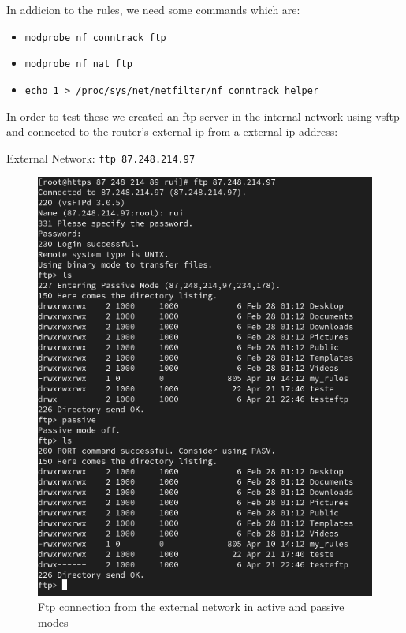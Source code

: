\documentclass{article}
\begin{document}
In addicion to the rules, we need some commands which are:
\begin{itemize}
    \item \texttt{modprobe nf\_conntrack\_ftp}\par
    \item \texttt{modprobe nf\_nat\_ftp}\par
    \item \texttt{echo 1 > /proc/sys/net/netfilter/nf\_conntrack\_helper}\par
\end{itemize}

In order to test these we created an ftp server in the internal network using vsftp and connected to the router's external ip from a external ip address:
\texttt{}\par
\texttt{}\par
External Network: \texttt{ftp 87.248.214.97} \par
\texttt{}\par
\begin{figure}[H]
    \centering
    \includegraphics[scale=0.5]{out/out_ftp.png}
    \caption{Ftp connection from the external network in active and passive modes}
    \label{fig:network-arc}
\end{figure}
\end{document}
